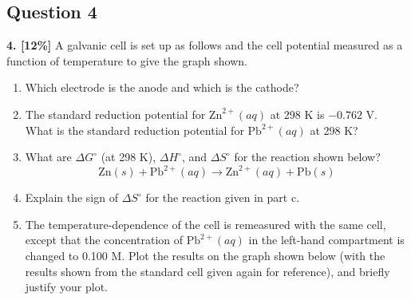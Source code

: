 \documentclass[10pt,a4paper]{article}
\begin{document}
\subsection*{Question 4}
\textbf{4. [12\%]} A galvanic cell is set up as follows and the cell potential measured as a function of temperature to give the graph shown.
\begin{enumerate}[label=\alph*.]
    \vspace{5cm} \item Which electrode is the anode and which is the cathode?
    \vspace{5cm} \item The standard reduction potential for $\text{Zn}^{2+}(aq)$ at 298 K is $-0.762$ V. What is the standard reduction potential for $\text{Pb}^{2+}(aq)$ at 298 K?
    \vspace{5cm} \item What are $\Delta G^\circ$ (at 298 K), $\Delta H^\circ$, and $\Delta S^\circ$ for the reaction shown below?
    $$\text{Zn}(s)+\text{Pb}^{2+}(aq)\rightarrow \text{Zn}^{2+}(aq)+\text{Pb}(s)$$
    \vspace{5cm} \item Explain the sign of $\Delta S^\circ$ for the reaction given in part c.
    \vspace{5cm} \item The temperature-dependence of the cell is remeasured with the same cell, except that the concentration of $\text{Pb}^{2+}(aq)$ in the left-hand compartment is changed to 0.100 M. Plot the results on the graph shown below (with the results shown from the standard cell given again for reference), and briefly justify your plot.
\end{enumerate}
\end{document}
